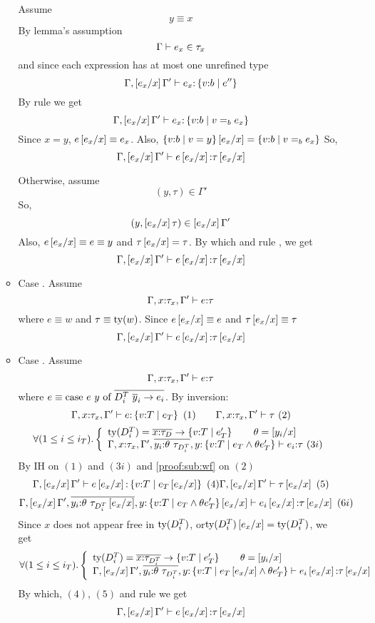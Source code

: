 \begin{enumerate}
\begin{itemize}
Assume
$$y \equiv x$$
By lemma's assumption 
$$\shastype{\Gamma}{e_x}{\tau_x}$$
and since each expression has at most one unrefined type
$$\hastype{\Gamma,\sub{x}{e_x}\Gamma'}{e_x}{\tref{v}{b}{e''}}$$
By rule \rtexact we get
$$\hastype{\Gamma,\sub{x}{e_x}\Gamma'}{e_x}{\tref{v}{b}{v \eqb{b} e_x}}$$
Since $x = y$, $e\sub{x}{e_x} \equiv e_x$.
Also, $\tref{v}{b}{v=y}\sub{x}{e_x}=\tref{v}{b}{v \eqb{b} e_x}$ 
So,
$$\hastype{\Gamma,\sub{x}{e_x}\Gamma'}{e\sub{x}{e_x}}{\tau\sub{x}{e_x}}$$

Otherwise, assume
$$(y,\tau)\in \Gamma'$$
So,
$$(y,\sub{x}{e_x}\tau)\in \sub{x}{e_x}\Gamma'$$
Also, $e\sub{x}{e_x}\equiv e \equiv y$ and $\tau\sub{x}{e_x} =\tau$.
By which and rule \rtvar, we get
$$\hastype{\Gamma,\sub{x}{e_x}\Gamma'}{e\sub{x}{e_x}}{\tau\sub{x}{e_x}}$$

\item Case \rtconst.
Assume 
	$$\hastype{\Gamma, x\colon\tau_x, \Gamma'}{e}{\tau}$$
where $e \equiv w$ and $\tau\equiv\ty{w}$.
Since $e\sub{x}{e_x} \equiv e$ and $\tau\sub{x}{e_x}\equiv\tau$
$$\hastype{\Gamma,\sub{x}{e_x}\Gamma'}{e\sub{x}{e_x}}{\tau\sub{x}{e_x}}$$

\item Case \rtcase.
Assume 
	$$\hastype{\Gamma, x\colon\tau_x, \Gamma'}{e}{\tau}$$
where $e \equiv \ecase{e}{y}{\dcti}{\overline{y}_i}{e_i}$.
By inversion:
$$
	\hastype{\Gamma, x\colon\tau_x, \Gamma'}{e}{\tref{v}{T}{e_T}}\ (1)\qquad
	\iswellformed{\Gamma, x\colon\tau_x, \Gamma'}{\tau}\ (2)
$$
$$
	\tforalli{T}. \left\lbrace
	\begin{array}{ll}
 	\ty{\dcti} = \overline{x\colon\tau_D}\rightarrow \tref{v}{T}{e'_T} \qquad
 	\theta = \sub{x}{y_i} \cr
	\hastype{\Gamma, x\colon\tau_x, \Gamma', \overline{y_i\colon\theta\ \tau_{\dcti}}, 
				y\colon \tref{v}{T}{e_T \land \theta e'_T}
				}{e_i}{\tau}\ (3i)
	\end{array} \right.
$$
By IH on $(1)$ and $(3i)$ and \ref{proof:sub:wf} on $(2)$
$$
	\hastype{\Gamma, \sub{x}{e_x}\Gamma'}{e\sub{x}{e_x}}{\tref{v}{T}{e_T\sub{x}{e_x}}}\ (4)
	\iswellformed{\Gamma, \sub{x}{e_x}\Gamma'}{\tau\sub{x}{e_x}}\ (5)
$$
$$
	\hastype{\Gamma, \sub{x}{e_x}\Gamma', \overline{y_i\colon\theta\ \tau_{\dcti}\sub{x}{e_x}}, 
				y\colon \tref{v}{T}{e_T \land \theta e'_T}\sub{x}{e_x}
				}{e_i\sub{x}{e_x}}{\tau\sub{x}{e_x}}\ (6i)
$$
Since $x$ does not appear free in $\ty{\dcti}$, or$\ty{\dcti}\sub{x}{e_x} = \ty{\dcti}$, 
we get
$$
	\tforalli{T}. \left\lbrace
	\begin{array}{ll}
 	\ty{\dcti} = \overline{x\colon\tau_{\dcti}}\rightarrow \tref{v}{T}{e'_T} \qquad
 	\theta = \sub{x}{y_i} \cr
	\hastype{\Gamma, \sub{x}{e_x}\Gamma', \overline{y_i\colon\theta\ \tau_{\dcti}}, 
				y\colon \tref{v}{T}{e_T\sub{x}{e_x} \land \theta e'_T}
				}{e_i\sub{x}{e_x}}{\tau\sub{x}{e_x}}
	\end{array} \right.
$$
By which, $(4)$, $(5)$ and rule \rtcase we get
$$\hastype{\Gamma, \sub{x}{e_x}\Gamma'}{e\sub{x}{e_x}}{\tau\sub{x}{e_x}}$$



\end{itemize}
\end{enumerate}
